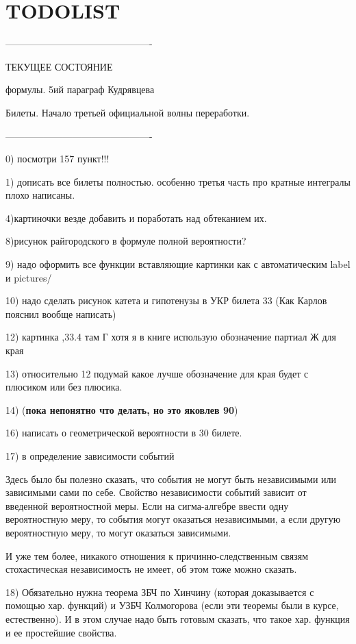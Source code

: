\chapter{TODOLIST}


----------------------------------------------

ТЕКУЩЕЕ СОСТОЯНИЕ

формулы. 5ий параграф Кудрявцева

Билеты. Начало третьей официальной волны переработки. 

----------------------------------------------


0) посмотри 157 пункт!!!

1) дописать все билеты полностью. особенно третья часть про кратные интегралы плохо написаны.

4)картиночки везде добавить и поработать над обтеканием их.
 
8)рисунок райгородского в формуле полной вероятности?
 
9) надо оформить все функции вставляющие картинки как \usepict с автоматическим label и pictures/
 
10) надо сделать рисунок катета и гипотенузы в УКР билета 33
(Как Карлов пояснил вообще написать)
 
12) картинка ,33.4 там Г хотя я в книге использую обозначение партиал Ж для края

13) относительно 12 подумай какое лучше обозначение для края будет с плюсиком или без плюсика. 

14) (\textbf{пока непонятно что делать, но это яковлев 90})

16) написать о геометрической вероятности в 30 билете.

17) в определение зависимости событий

Здесь было бы полезно сказать, что события не могут быть независимыми или зависимыми сами по себе. Свойство независимости событий зависит от введенной вероятностной меры. Если на сигма-алгебре ввести одну вероятностную меру, то события могут оказаться независимыми, а если другую вероятностную меру, то могут оказаться зависимыми.

И уже тем более, никакого отношения к причинно-следственным связям стохастическая независимость не имеет, об этом тоже можно сказать.

18) Обязательно нужна теорема ЗБЧ по Хинчину (которая доказывается с помощью хар. функций) и УЗБЧ Колмогорова (если эти теоремы были в курсе, естественно). И в этом случае надо быть готовым сказать, что такое хар. функция и ее простейшие свойства.

